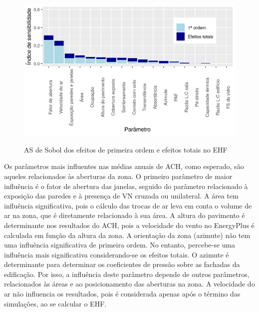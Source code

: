 \documentclass[brazil,hardcopy,openany,a4paper]{ufscthesis}
\begin{document}
	\begin{figure}[H]
		\centering
		\caption{AS de Sobol dos efeitos de primeira ordem e efeitos totais no EHF}
		\includegraphics[width=1\linewidth]{img/as_ehf.png}
		\label{fig:as_ehf}
	\end{figure}

	Os parâmetros mais influentes nas médias anuais de ACH, como esperado, são aqueles relacionados às aberturas da zona. 
	O primeiro parâmetro de maior influência é o fator de abertura das janelas, seguido do parâmetro relacionado à exposição das paredes e à presença de VN cruzada ou unilateral. A área tem influência significativa, pois o cálculo das trocas de ar leva em conta o volume de ar na zona, que é diretamente relacionado à sua área. 
	A altura do pavimento é determinante nos resultados do ACH, pois a velocidade do vento no EnergyPlus é calculada em função da altura da zona.
	A orientação da zona (azimute) não tem uma influência significativa de primeira ordem. No entanto, percebe-se uma influência mais significativa considerando-se os efeitos totais. O azimute é determinante para determinar os coeficientes de pressão sobre as fachadas da edificação. Por isso, a influência deste parâmetro depende de outros parâmetros, relacionados às áreas e ao posicionamento das aberturas na zona.
	A velocidade do ar não influencia os resultados, pois é considerada apenas após o término das simulações, ao se calcular o EHF.
	
\end{document}
